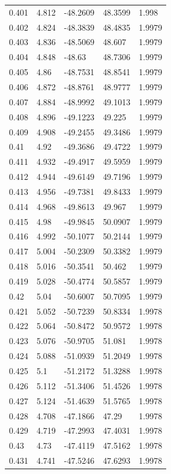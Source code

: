 \begin{tabular}{lllll}
0.401 & 4.812 & -48.2609 & 48.3599 & 1.998 \\
0.402 & 4.824 & -48.3839 & 48.4835 & 1.9979 \\
0.403 & 4.836 & -48.5069 & 48.607 & 1.9979 \\
0.404 & 4.848 & -48.63 & 48.7306 & 1.9979 \\
0.405 & 4.86 & -48.7531 & 48.8541 & 1.9979 \\
0.406 & 4.872 & -48.8761 & 48.9777 & 1.9979 \\
0.407 & 4.884 & -48.9992 & 49.1013 & 1.9979 \\
0.408 & 4.896 & -49.1223 & 49.225 & 1.9979 \\
0.409 & 4.908 & -49.2455 & 49.3486 & 1.9979 \\
0.41 & 4.92 & -49.3686 & 49.4722 & 1.9979 \\
0.411 & 4.932 & -49.4917 & 49.5959 & 1.9979 \\
0.412 & 4.944 & -49.6149 & 49.7196 & 1.9979 \\
0.413 & 4.956 & -49.7381 & 49.8433 & 1.9979 \\
0.414 & 4.968 & -49.8613 & 49.967 & 1.9979 \\
0.415 & 4.98 & -49.9845 & 50.0907 & 1.9979 \\
0.416 & 4.992 & -50.1077 & 50.2144 & 1.9979 \\
0.417 & 5.004 & -50.2309 & 50.3382 & 1.9979 \\
0.418 & 5.016 & -50.3541 & 50.462 & 1.9979 \\
0.419 & 5.028 & -50.4774 & 50.5857 & 1.9979 \\
0.42 & 5.04 & -50.6007 & 50.7095 & 1.9979 \\
0.421 & 5.052 & -50.7239 & 50.8334 & 1.9978 \\
0.422 & 5.064 & -50.8472 & 50.9572 & 1.9978 \\
0.423 & 5.076 & -50.9705 & 51.081 & 1.9978 \\
0.424 & 5.088 & -51.0939 & 51.2049 & 1.9978 \\
0.425 & 5.1 & -51.2172 & 51.3288 & 1.9978 \\
0.426 & 5.112 & -51.3406 & 51.4526 & 1.9978 \\
0.427 & 5.124 & -51.4639 & 51.5765 & 1.9978 \\
0.428 & 4.708 & -47.1866 & 47.29 & 1.9978 \\
0.429 & 4.719 & -47.2993 & 47.4031 & 1.9978 \\
0.43 & 4.73 & -47.4119 & 47.5162 & 1.9978 \\
0.431 & 4.741 & -47.5246 & 47.6293 & 1.9978 \\

\end{tabular}
